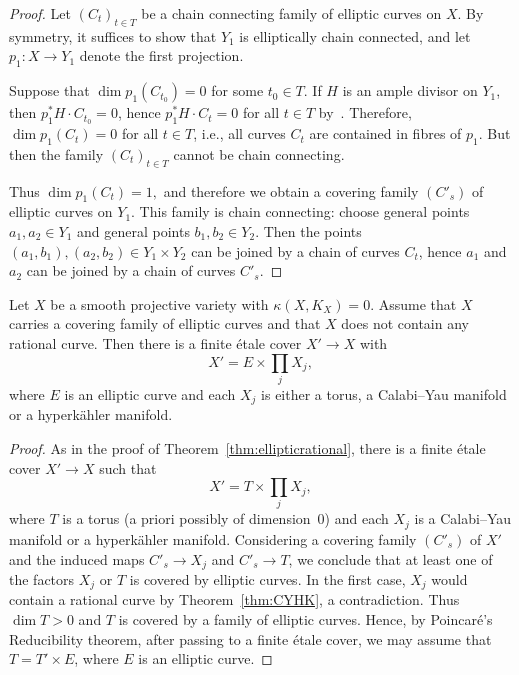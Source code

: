 \begin{proof}
Let $(C_t)_{t\in T}$ be a chain connecting family of elliptic curves on $X$. By symmetry, it suffices to show that $Y_1$ is elliptically chain connected, and let $p_1\colon X \to Y_1$ denote the first projection.

Suppose that $\dim p_1(C_{t_0}) = 0$ for some $t_0\in T$. If $H$ is an ample divisor on $Y_1$, then $p_1^*H\cdot C_{t_0}=0$, hence $p_1^*H\cdot C_t=0$ for all $t\in T$ by~\cite[Proposition~I.3.12]{Kol96}. Therefore, $\dim p_1(C_t) = 0$ for all $t\in T$, i.e., all curves $C_t$ are contained in fibres of $p_1$. But then the family $(C_t)_{t\in T}$ cannot be chain connecting.

Thus $\dim p_1(C_t) = 1,$ and therefore we obtain a covering family $(C'_s)$ of elliptic curves on $Y_1$. This family is chain connecting: choose general points $a_1, a_2 \in Y_1$ and general points $b_1,b_2 \in Y_2$. Then the points $(a_1,b_1),(a_2,b_2)\in Y_1\times Y_2$ can be joined by a chain of curves $C_t$, hence $a_1$ and $a_2$ can be joined by a chain of curves $C'_s$.
\end{proof}
\goodbreak
\begin{theo}\label{thm:kappa0}
Let $X$ be a smooth projective variety with $\kappa (X,K_X) = 0$. Assume that $X$ carries a covering family of elliptic curves and that $X$ does not contain any rational curve. Then there is a finite étale cover $X' \to X$ with
\[
X'=E \times \prod_j X_j,
\]
where $E$ is an elliptic curve and each $X_j$ is either a torus, a Calabi--Yau manifold or a hyperkähler manifold.
\end{theo}

\begin{proof}
As in the proof of Theorem~\ref{thm:ellipticrational}, there is a finite étale cover $X'\to X$ such that
\[
X'= T \times \prod_j X_j,
\]
where $T$ is a torus (a priori possibly of dimension~$0$) and each $X_j$ is a Calabi--Yau manifold or a hyperkähler manifold. Considering a covering family $(C'_s)$ of $X'$ and the induced maps $C'_s \to X_j$ and $C'_s \to T$, we conclude that at least one of the factors $X_j$ or $T$ is covered by elliptic curves. In the first case, $X_j$ would contain a rational curve by Theorem~\ref{thm:CYHK}, a contradiction. Thus $\dim T > 0 $ and $T$ is covered by a family of elliptic curves. Hence, by Poincaré's Reducibility theorem, after passing to a finite étale cover, we may assume that $T = T' \times E$, where $E$ is an elliptic curve.
\end{proof}\qedhere


